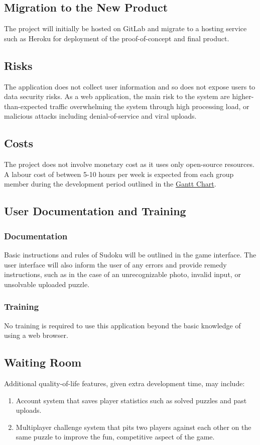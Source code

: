 \documentclass[11pt]{article}
\begin{document}
\subsection{Migration to the New Product}
The project will initially be hosted on GitLab and migrate to a hosting service such as Heroku for deployment of the proof-of-concept and final product.

\subsection{Risks}
The application does not collect user information and so does not expose users to data security risks. As a web application, the main risk to the system are higher-than-expected traffic overwhelming the system through high processing load, or malicious attacks including denial-of-service and viral uploads.

\subsection{Costs}
The project does not involve monetary cost as it uses only open-source resources. A labour cost of between 5-10 hours per week is expected from each group member during the development period outlined in the \href{https://gitlab.cas.mcmaster.ca/bhuiyr2/sudokusolver_l02_grp08/-/blob/main/ProjectSchedule/Gantt_Sudoku.pdf}{Gantt Chart}.

\subsection{User Documentation and Training}
\subsubsection{Documentation}
Basic instructions and rules of Sudoku will be outlined in the game interface. The user interface will also inform the user of any errors and provide remedy instructions, such as in the case of an unrecognizable photo, invalid input, or unsolvable uploaded puzzle.

\subsubsection{Training}
No training is required to use this application beyond the basic knowledge of using a web browser.

\subsection{Waiting Room}
Additional quality-of-life features, given extra development time, may include:
\begin{enumerate}
    \item Account system that saves player statistics such as solved puzzles and past uploads.
    \item Multiplayer challenge system that pits two players against each other on the same puzzle to improve the fun, competitive aspect of the game.
\end{enumerate}
\end{document}
